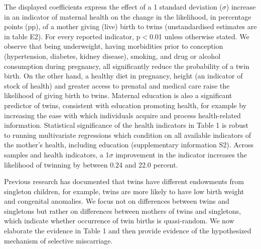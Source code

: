 \documentclass{nature}
\begin{document}
\begin{linenumbers}
The displayed coefficients express the effect of a 1 standard deviation ($\sigma$) increase in an indicator of maternal health on the change in the likelihood, in percentage points (pp), of a mother giving (live) birth to twins (unstandardised estimates are in table E2). For every reported indicator, p$<$0.01 unless otherwise stated. %
We observe that being underweight, having morbidities prior to conception (hypertension, diabetes, kidney disease), smoking, and drug or alcohol consumption during pregnancy, all significantly reduce the probability of a twin birth. On the other hand, a healthy diet in pregnancy, height (an indicator of stock of health\cite{Silventoinen2003,BhalotraRawlings2013}) and greater access to prenatal and medical care raise the likelihood of giving birth to twins. Maternal education is also a significant predictor of twins, consistent with education promoting health, for example by increasing the ease with which individuals acquire and process health-related information\cite{Kenkel1991,CutlerLlerasMuney2010}. %
Statistical significance of the health indicators in Table 1 is robust to running multivariate regressions which condition on all available indicators of the mother's health, including education (supplementary information S2).  Across samples and health indicators, a 1$\sigma$ improvement in the indicator increases the likelihood of twinning by between 0.24 and 22.0 percent.

Previous research has documented that twins have different endowments from singleton children, for example, twins are more likely to have low birth weight and congenital anomalies\cite{Hall2003}. We focus not on differences between twins and singletons but rather on differences between mothers of twins and singletons, which indicate whether occurrence of twin births is quasi-random. We now elaborate the evidence in Table 1 and then provide evidence of the hypothesized mechanism of selective miscarriage.


\end{linenumbers}
\end{document}
